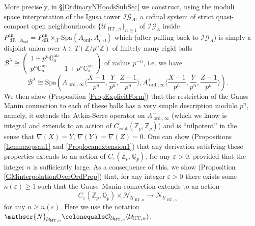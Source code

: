 \documentclass[10pt, oneside]{amsart}
\newcommand{\defeq}{\colonequals}
\numberwithin{equation}{subsection}
\theoremstyle{definition}
\theoremstyle{remark}
\newcommand{\mbb}[1]{\mathbb{#1}}
\newcommand{\opn}[1]{\operatorname{#1}}
\def\Q{\mathbb{Q}}
\def\Z{{\mathbb{Z}}}
\def\epsilon{\varepsilon}
\def\Spa{\mathrm{Spa}}
\begin{document}
More precisely, in \S \ref{OrdinaryNHoodsSubSec} we construct, using the moduli space interpretation of the Igusa tower $\mathcal{IG}_{A}$, a cofinal system of strict quasi-compact open neighbourhoods $\{ \mathcal{U}_{\opn{HT}, n} \}_{n \geq 1}$ of $\mathcal{IG}_{A}$ inside $P_{\opn{dR}, A_{\opn{ord}}}^{\opn{an}} = P_{\opn{dR}}^{\opn{an}} \times_{\mathcal{X}} \Spa (A_{\opn{ord}}, A_{\opn{ord}}^+)$ which (after pulling back to $\mathcal{IG}_{A}$) is simply a disjoint union over $\lambda \in T(\mbb{Z}/p^n\mbb{Z})$ of finitely many rigid balls $\mathcal{B}^{\lambda} \cong \left(
\begin{smallmatrix}
    1 + p^n \mathbb{G}_{a}^{\opn{an}} & \\ p^n \mathbb{G}_a^{\opn{an}} & 1 + p^n \mathbb{G}_a^{\opn{an}} \end{smallmatrix} \right)$
of radius $p^{-n}$, i.e. we have
\[ 
\mathcal{B}^\lambda \cong \Spa \left( A_{\opn{ord}, \infty} \langle \frac{X-1}{p^n}, \frac{Y}{p^n}, \frac{Z - 1}{p^n}\rangle, A^+_{\opn{ord}, \infty} \langle \frac{X-1}{p^n}, \frac{Y}{p^n}, \frac{Z - 1}{p^n} \rangle \right). 
\]
We then show (Proposition \ref{PropExplicitForm}) that the restriction of the Gauss-Manin connection to each of these balls has a very simple description modulo $p^n$, namely, it extends the Atkin-Serre operator on $A^+_{\opn{ord}, \infty}$ (which we know is integral and extends to an action of $C_{\opn{cont}}(\mbb{Z}_p, \mbb{Z}_p)$) and is ``nilpotent'' in the sense that $\nabla(X) = Y$, $\nabla(Y) = \nabla(Z) = 0$. One can show (Propositions \ref{Lemmaepsan1} and \ref{Proplocanextension1}) that any derivation satisfying these properties extends to an action of $C_{\varepsilon}(\Z_p, \Q_p)$, for any $\epsilon > 0$, provided that the integer $n$ is sufficiently large. As a consequence of this, we show (Proposition \ref{GMinterpolationOverOrdProp}) that, for any integer $\varepsilon > 0$ there exists some $n(\varepsilon) \geq 1$ such that the Gauss--Manin connection extends to an action
\begin{equation} \label{EquationIntroepsilonan}
C_{\varepsilon}(\Z_p, \Q_p) \times \mathscr{N}_{\mathcal{U}_{\opn{HT}, n}} \to \mathscr{N}_{\mathcal{U}_{\opn{HT}, n}}
\end{equation}
for any $n \geq n(\epsilon)$. Here we use the notation $\mathscr{N}_{\mathcal{U}_{\opn{HT}, n}} \defeq \mathcal{O}_{\mathcal{U}_{\opn{HT}, n}}(\mathcal{U}_{\opn{HT}, n})$.
\end{document}
